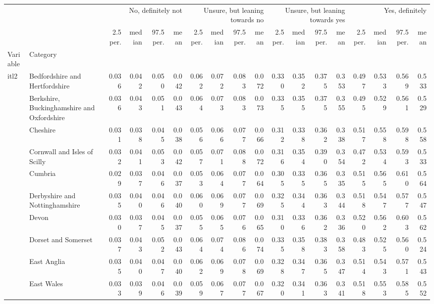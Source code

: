 \begin{tabular}{llrrrrrrrrrrrrrrrr}
\toprule
 &  & \multicolumn{4}{r}{No, definitely not} & \multicolumn{4}{r}{Unsure, but leaning towards no} & \multicolumn{4}{r}{Unsure, but leaning towards yes} & \multicolumn{4}{r}{Yes, definitely} \\
 &  & 2.5 per. & median & 97.5 per. & mean & 2.5 per. & median & 97.5 per. & mean & 2.5 per. & median & 97.5 per. & mean & 2.5 per. & median & 97.5 per. & mean \\
Variable & Category &  &  &  &  &  &  &  &  &  &  &  &  &  &  &  &  \\
\midrule
\multirow[t]{41}{*}{itl2} & Bedfordshire and Hertfordshire & 0.036 & 0.042 & 0.050 & 0.042 & 0.062 & 0.072 & 0.083 & 0.072 & 0.330 & 0.352 & 0.375 & 0.353 & 0.497 & 0.533 & 0.569 & 0.533 \\
 & Berkshire, Buckinghamshire and Oxfordshire & 0.036 & 0.043 & 0.051 & 0.043 & 0.064 & 0.073 & 0.083 & 0.073 & 0.335 & 0.355 & 0.375 & 0.355 & 0.495 & 0.529 & 0.561 & 0.529 \\
 & Cheshire & 0.031 & 0.038 & 0.045 & 0.038 & 0.056 & 0.066 & 0.077 & 0.066 & 0.312 & 0.338 & 0.362 & 0.338 & 0.517 & 0.558 & 0.598 & 0.558 \\
 & Cornwall and Isles of Scilly & 0.032 & 0.041 & 0.053 & 0.042 & 0.057 & 0.071 & 0.088 & 0.072 & 0.316 & 0.354 & 0.390 & 0.354 & 0.472 & 0.534 & 0.593 & 0.533 \\
 & Cumbria & 0.029 & 0.037 & 0.046 & 0.037 & 0.053 & 0.064 & 0.077 & 0.064 & 0.305 & 0.335 & 0.365 & 0.335 & 0.515 & 0.565 & 0.610 & 0.564 \\
 & Derbyshire and Nottinghamshire & 0.035 & 0.040 & 0.046 & 0.040 & 0.060 & 0.069 & 0.077 & 0.069 & 0.325 & 0.344 & 0.363 & 0.344 & 0.518 & 0.547 & 0.577 & 0.547 \\
 & Devon & 0.030 & 0.037 & 0.045 & 0.037 & 0.055 & 0.065 & 0.076 & 0.065 & 0.310 & 0.336 & 0.362 & 0.336 & 0.520 & 0.562 & 0.603 & 0.562 \\
 & Dorset and Somerset & 0.037 & 0.043 & 0.052 & 0.043 & 0.064 & 0.074 & 0.086 & 0.074 & 0.335 & 0.358 & 0.383 & 0.358 & 0.483 & 0.525 & 0.560 & 0.524 \\
 & East Anglia & 0.035 & 0.040 & 0.047 & 0.040 & 0.062 & 0.069 & 0.078 & 0.069 & 0.328 & 0.347 & 0.365 & 0.347 & 0.514 & 0.543 & 0.571 & 0.543 \\
 & East Wales & 0.033 & 0.039 & 0.046 & 0.039 & 0.059 & 0.067 & 0.077 & 0.067 & 0.320 & 0.341 & 0.363 & 0.341 & 0.518 & 0.553 & 0.585 & 0.552 \\

\end{tabular}
